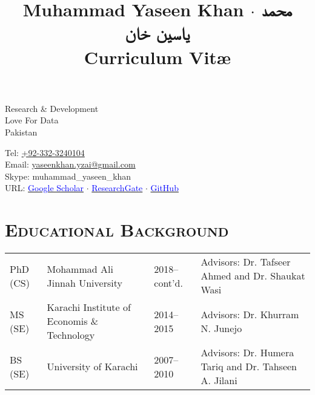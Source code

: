 \documentclass[a4paper, 10pt]{article}
\title{{\huge Muhammad Yaseen Khan}
 $\cdot$ {\huge\texturdu{محمد یاسین خان}}
\\\small Curriculum Vit\ae}
\author{}
\date{}
\begin{document}
\maketitle
\vspace{-3em}
\begin{minipage}{0.45\textwidth}
Research \& Development\\
Love For Data\\
Pakistan\\
\hfill
\end{minipage}
\hfill
\begin{minipage}{0.45\textwidth}
Tel: \href{tel:+923323240104}{+92-332-3240104}\\
Email: \href{mailto:yaseenkhan.yzai@gmail.com}{yaseenkhan.yzai@gmail.com}\\
Skype: muhammad\_yaseen\_khan\\
URL: \href{https://scholar.google.com/citations?user=a_d2KTEAAAAJ&hl=en}{\textcolor{blue}{Google Scholar}} $\cdot$ \href{https://www.researchgate.net/profile/Muhammad_Yaseen_Khan}{\textcolor{blue}{ResearchGate}} $\cdot$ \href{https://www.github.com/MuhammadYaseenKhan}{\textcolor{blue}{GitHub}}
\end{minipage}


\section*{\normalfont\textsc{Educational Background}}
{
\tabcolsep=3pt
\begin{tabular}{llll}
PhD (CS) & Mohammad Ali Jinnah University & 2018--cont'd. & Advisors: Dr. Tafseer Ahmed and Dr. Shaukat Wasi\\
MS (SE) & Karachi Institute of Economis \& Technology & 2014--2015 & Advisors: Dr. Khurram N. Junejo\\
BS (SE) & University of Karachi & 2007--2010 & Advisors: Dr. Humera Tariq and Dr. Tahseen A. Jilani\\
\end{tabular}
}
\end{document}
